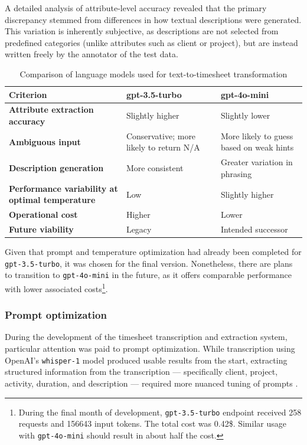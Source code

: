 \documentclass[
  digital,     %
  oneside,     %
  nosansbold,  %
  nocolorbold, %
  lof,         %
  lot,         %
]{fithesis4}
\begin{document}
A detailed analysis of attribute-level accuracy revealed that the primary discrepancy stemmed from differences in how textual descriptions were generated. This variation is inherently subjective, as descriptions are not selected from predefined categories (unlike attributes such as client or project), but are instead written freely by the annotator of the test data.

\begin{table}[H]
\centering
\begin{tabularx}{\textwidth}{|X|X|X|}
\hline
\textbf{Criterion} & \textbf{gpt-3.5-turbo} & \textbf{gpt-4o-mini} \\
\hline
\textbf{Attribute extraction accuracy} & Slightly higher & Slightly lower \\
\hline
\textbf{Ambiguous input} & Conservative; more likely to return \gls{N/A} & More likely to guess based on weak hints \\
\hline
\textbf{Description generation} & More consistent & Greater variation in phrasing \\
\hline
\textbf{Performance variability at optimal temperature} & Low & Slightly higher \\
\hline
\textbf{Operational cost} & Higher & Lower \\
\hline
\textbf{Future viability} & Legacy & Intended successor \\
\hline
\end{tabularx}
\caption{Comparison of language models used for text-to-timesheet transformation}
\label{tab:text_to_timesheet_models}
\end{table}

Given that prompt and temperature optimization had already been completed for \texttt{gpt-3.5-turbo}, it was chosen for the final version. Nonetheless, there are plans to transition to \texttt{gpt-4o-mini} in the future, as it offers comparable performance with lower associated costs\footnote{During the final month of development, \texttt{gpt-3.5-turbo} endpoint received 258 requests and 156643 input tokens. The total cost was 0.42\$. Similar usage with \texttt{gpt-4o-mini} should result in about half the cost.}.

\subsubsection{Prompt optimization}

During the development of the timesheet transcription and extraction system, particular attention was paid to prompt optimization. While transcription using OpenAI's \texttt{whisper-1} model produced usable results from the start, extracting structured information from the transcription --- specifically client, project, activity, duration, and description --- required more nuanced tuning of prompts \cite{openaiPrompt}.
\end{document}
